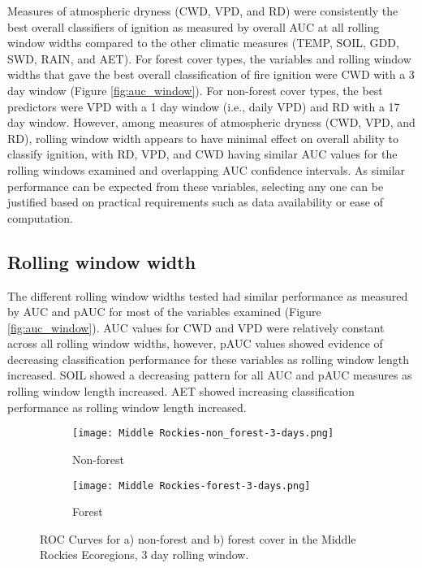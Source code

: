 \documentclass[11p]{article}
\begin{document}
Measures of atmospheric dryness (CWD, VPD, and RD) were consistently the best overall classifiers of ignition as measured by overall AUC at all rolling window widths compared to the other climatic measures (TEMP, SOIL, GDD, SWD, RAIN, and AET). For forest cover types, the variables and rolling window widths that gave the best overall classification of fire ignition were CWD with a 3 day window (Figure \ref{fig:auc_window}). For non-forest cover types, the best predictors were VPD with a 1 day window (i.e., daily VPD) and RD with a 17 day window. However, among measures of atmospheric dryness (CWD, VPD, and RD), rolling window width appears to have minimal effect on overall ability to classify ignition, with RD, VPD, and CWD having similar AUC values for the rolling windows examined and overlapping AUC confidence intervals. As similar performance can be expected from these variables, selecting any one can be justified based on practical requirements such as data availability or ease of computation.

\subsection{Rolling window width}

The different rolling window widths tested had similar performance as measured by AUC and pAUC for most of the variables examined (Figure \ref{fig:auc_window}). AUC values for CWD and VPD were relatively constant across all rolling window widths, however, pAUC values showed evidence of decreasing classification performance for these variables as rolling window length increased. SOIL showed a decreasing pattern for all AUC and pAUC measures as rolling window length increased. AET showed increasing classification performance as rolling window length increased.  

\begin{figure}[htbp]
  \centering
  \begin{subfigure}{.5\textwidth}
    \centering
    \texttt{[image: Middle Rockies-non\_forest-3-days.png]}
    \caption{Non-forest}
    \label{fig:mr-nf-auc}
  \end{subfigure}%
  \begin{subfigure}{.5\textwidth}
    \centering
    \texttt{[image: Middle Rockies-forest-3-days.png]}
    \caption{Forest}
    \label{fig:mr-f-auc}
  \end{subfigure}
  \caption{ROC Curves for a) non-forest and b) forest cover in the Middle Rockies Ecoregions, 3 day rolling window.}
  \label{fig:auc}
\end{figure}
\end{document}
